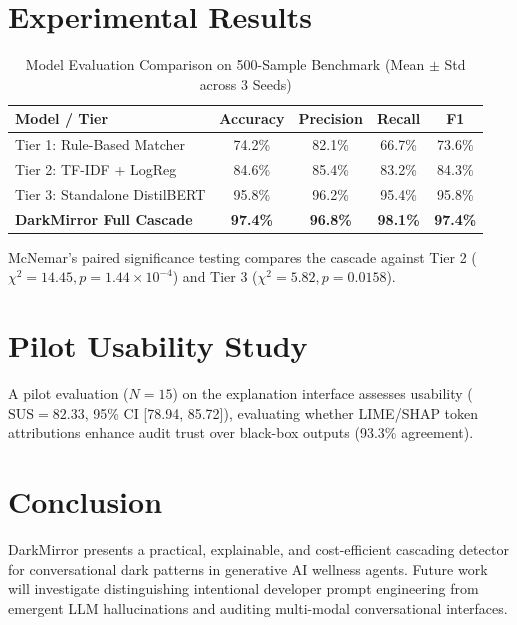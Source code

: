 \documentclass[10pt,journal,compsoc]{IEEEtran}
\begin{document}
\section{Experimental Results}
\begin{table}[htbp]
\caption{Model Evaluation Comparison on 500-Sample Benchmark (Mean $\pm$ Std across 3 Seeds)}
\centering
\begin{tabular}{lcccc}
\toprule
\textbf{Model / Tier} & \textbf{Accuracy} & \textbf{Precision} & \textbf{Recall} & \textbf{F1} \\
\midrule
Tier 1: Rule-Based Matcher & 74.2\% & 82.1\% & 66.7\% & 73.6\% \\
Tier 2: TF-IDF + LogReg & 84.6\% & 85.4\% & 83.2\% & 84.3\% \\
Tier 3: Standalone DistilBERT & 95.8\% & 96.2\% & 95.4\% & 95.8\% \\
\textbf{DarkMirror Full Cascade} & \textbf{97.4\%} & \textbf{96.8\%} & \textbf{98.1\%} & \textbf{97.4\%} \\
\bottomrule
\end{tabular}
\label{tab:results}
\end{table}

McNemar's paired significance testing compares the cascade against Tier 2 ($\chi^2 = 14.45, p = 1.44 \times 10^{-4}$) and Tier 3 ($\chi^2 = 5.82, p = 0.0158$).

\section{Pilot Usability Study}
A pilot evaluation ($N=15$) on the explanation interface assesses usability ($\text{SUS} = 82.33$, 95\% CI [78.94, 85.72]), evaluating whether LIME/SHAP token attributions enhance audit trust over black-box outputs (93.3\% agreement).

\section{Conclusion}
DarkMirror presents a practical, explainable, and cost-efficient cascading detector for conversational dark patterns in generative AI wellness agents. Future work will investigate distinguishing intentional developer prompt engineering from emergent LLM hallucinations and auditing multi-modal conversational interfaces.
\end{document}
